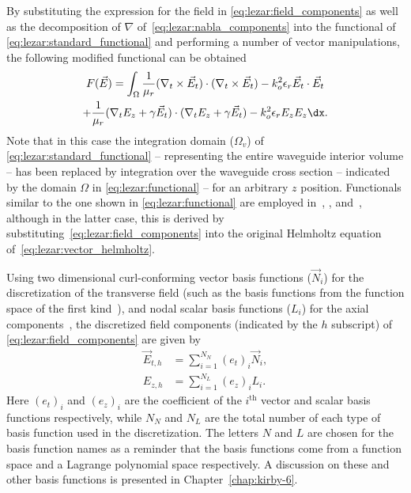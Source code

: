 By substituting the expression for the field in
\eqref{eq:lezar:field_components} as well as the decomposition of
$\nabla$ of~\eqref{eq:lezar:nabla_components} into the functional of
\eqref{eq:lezar:standard_functional} and performing a number of vector
manipulations, the following modified functional can be obtained
\begin{multline}
    \label{eq:lezar:functional}
    F(\vec{E}) = \int_{\Omega}\frac{1}{\mu_r}(\nabla_t\times{\vec{E}_t})\cdot(\nabla_t\times{\vec{E}_t})
    - k_o^2\epsilon_r\vec{E}_t\cdot{\vec{E}_t}\\
    +\frac{1}{\mu_r}(\nabla_t{E_z} + \gamma\vec{E}_t)\cdot(\nabla_t{E_z} + \gamma\vec{E}_t)
    -k_o^2\epsilon_r E_z{E_z} \dx.
\end{multline}
Note that in this case the integration domain ($\Omega_v$) of
\eqref{eq:lezar:standard_functional} -- representing the entire
waveguide interior volume -- has been replaced by integration over
the waveguide cross section -- indicated by the domain $\Omega$ in
\eqref{eq:lezar:functional} -- for an arbitrary $z$ position. Functionals
similar to the one shown in \eqref{eq:lezar:functional}
are employed in~\citet{LeeSunCendes1991}, \citet{Jin2002},
and~\citet{PelosiCoccioliSelleri1998}, although in the latter case,
this is derived by substituting~\eqref{eq:lezar:field_components} into
the original Helmholtz equation of~\eqref{eq:lezar:vector_helmholtz}.

Using two dimensional curl-conforming vector basis functions
($\vec{N}_i$) for the discretization of the transverse field (such as
the basis functions from the \nedelec{} function space of the first
kind~\citep{Nedelec1980, Webb1993, Monk2003}), and nodal scalar basis
functions ($L_i$) for the axial components~\citep{Jin2002,
PelosiCoccioliSelleri1998}, the discretized field components
(indicated by the $h$ subscript) of \eqref{eq:lezar:field_components}
are given by~\citep{Jin2002, PelosiCoccioliSelleri1998}
\begin{align}
  \label{eq:lezar:E_t_discretized}
  \vec{E}_{t,h} &= \sum_{i=1}^{N_N} (e_t)_i \vec{N}_i,\\
  \label{eq:lezar:E_z_discretized}
  E_{z,h} &= \sum_{i=1}^{N_L} (e_z)_i L_i.
\end{align}
Here $(e_t)_i$ and $(e_z)_i$ are the coefficient of the $i^\text{th}$
vector and scalar basis functions respectively, while $N_N$ and $N_L$
are the total number of each type of basis function used in the
discretization. The letters $N$ and $L$ are chosen for the basis
function names as a reminder that the basis functions come from
a \nedelec{} function space and a Lagrange polynomial space
respectively. A discussion on these and other basis functions is
presented in Chapter~\ref{chap:kirby-6}.

